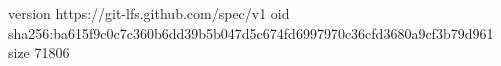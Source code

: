 version https://git-lfs.github.com/spec/v1
oid sha256:ba615f9c0c7c360b6dd39b5b047d5c674fd6997970c36cfd3680a9cf3b79d961
size 71806
